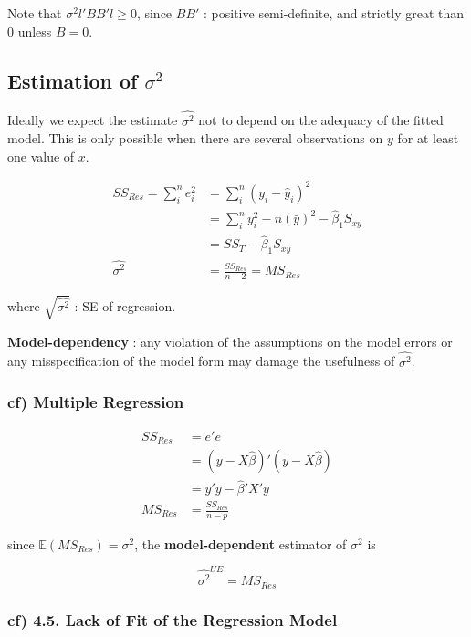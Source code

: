 \documentclass[12pt]{article}
\begin{document}
Note that $\sigma^2 l' B B' l \ge 0$, since $B B'$ : positive semi-definite, and strictly great than $0$ unless $B=0$.




\subsection{Estimation of $\sigma^2$}

Ideally we expect the estimate $\hat{\sigma^2}$ not to depend on the adequacy of the fitted model. This is only possible when there are several observations on $y$ for at least one value of $x$.

$$
\begin{aligned}
SS_{Res} = \sum_i^n e_i^2 &= \sum_i^n (y_i - \hat{y}_i)^2 \\
&= \sum_i^n y_i^2 - n (\bar{y})^2 - \hat{\beta}_1 S_{xy} \\
&= SS_T - \hat{\beta}_1 S_{xy} \\[10pt]
\hat{\sigma^2} &= \frac{SS_{Res}}{n-2} = MS_{Res}
\end{aligned}
$$

where $\sqrt{\hat{\sigma^2}}$ : SE of regression.

\textbf{Model-dependency} : any violation of the assumptions on the model errors or any misspecification of the model form may damage the usefulness of $\hat{\sigma^2}$.




\subsubsection*{cf) Multiple Regression }

$$
\begin{aligned}
SS_{Res} &= e'e \\[8pt]
&= (y - X\hat{\beta})' (y-X\hat{\beta}) \\[8pt]
&= y'y - \hat{\beta}' X'y \\[8pt]
MS_{Res} &= \frac{SS_{Res}}{n-p}
\end{aligned}
$$

since $\mathbb{E} (MS_{Res}) = \sigma^2$, the \textbf{model-dependent} estimator of $\sigma^2$ is

$$
\widehat{\sigma^2}^{UE} = MS_{Res}
$$


\subsubsection*{cf) 4.5. Lack of Fit of the Regression Model}
\end{document}
